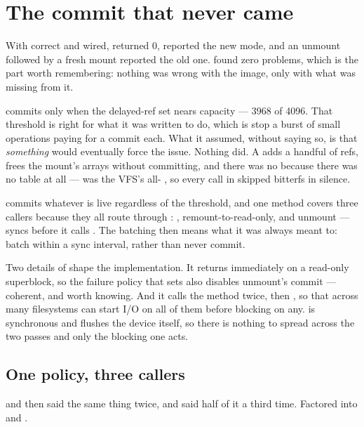 \section{The commit that never came}

With  correct and wired,  returned 0, 
reported the new mode, and an unmount followed by a fresh mount reported the old
one.  found zero problems, which is the part worth
remembering: nothing was wrong with the image, only with what was missing from
it.

 commits only when the delayed-ref set nears
capacity --- 3968 of 4096. That threshold is right for what it was written to
do, which is stop a burst of small operations paying for a commit each. What it
assumed, without saying so, is that \emph{something} would eventually force the
issue. Nothing did. A  adds a handful of refs, 
frees the mount's arrays without committing, and there was no 
because there was no  table at all ---  was the
VFS's all- , so every  call in
 skipped bitterfs in silence.

 commits whatever is live regardless of the
threshold, and one method covers three callers because they all route through
: , remount-to-read-only, and unmount ---
 syncs before it calls .
The batching then means what it was always meant to: batch within a sync
interval, rather than never commit.

Two details of  shape the implementation. It returns
immediately on a read-only superblock, so the failure policy that sets
 also disables unmount's commit --- coherent, and worth knowing.
And it calls the method twice,  then , so that
 across many filesystems can start I/O on all of them before
blocking on any.  is synchronous and flushes the device
itself, so there is nothing to spread across the two passes and only the
blocking one acts.

\subsection{One policy, three callers}

 and  then said the same thing twice, and
 said half of it a third time. Factored into
 and .


